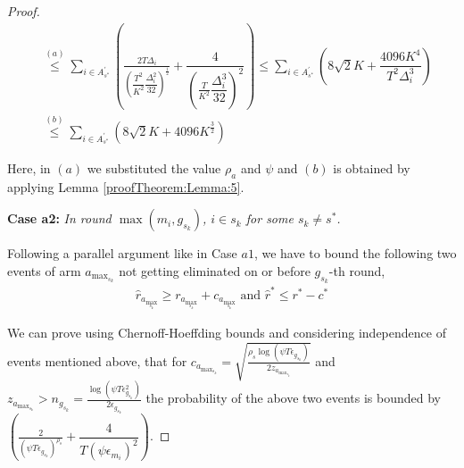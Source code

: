 \begin{proof}
\begin{align*}
&\overset{(a)}{\leq} \sum_{i\in A_{s^{*}}^{'}}\left(\frac{2T\Delta_{i}}{(\dfrac{T^2}{K^2}\dfrac{\Delta_{i}^{2}}{32})^{\frac{1}{2}}} + \dfrac{4}{(\frac{T}{K^2} \dfrac{\Delta_{i}^{3}}{32})^2}\right)  \leq \sum_{i\in A_{s^{*}}^{'}}\left(8\sqrt{2} K + \dfrac{4096 K^4}{T^2 \Delta_i^3}\right)\\
&\overset{(b)}{\leq}  \sum_{i\in A_{s^{*}}^{'}}\left(8\sqrt{2} K + 4096 K^{\frac{3}{2}}\right)
   \end{align*}
   
  Here, in $(a)$ we substituted the value $\rho_a$ and $\psi$ and $(b)$ is obtained by applying Lemma  \ref{proofTheorem:Lemma:5}.




\textbf{Case a2:} \textit{In round $\max(m_{i},g_{s_{k}})$, ${i} \in s_k$ for some $s_k \ne s^{*}$.}

Following a parallel argument like in Case $a1$, we have to bound the following two events of arm $a_{\max_{s_{k}}}$ not getting eliminated on or before $g_{s_{k}}$-th round,
\begin{align*}
  \hat{r}_{a_{\max_{s_{k}}}} \geq r_{a_{\max_{s_{k}}}} +c_{a_{\max_{s_{k}}}} \text{ and } \hat{r}^{*} \leq r^{*} - c^{*} 
\end{align*} 

We can prove using Chernoff-Hoeffding bounds and considering independence of events mentioned above, that for $c_{a_{\max_{s_{k}}}}=\sqrt{\frac{\rho_{s} \log (\psi T\epsilon_{g_{s_{k}}})}{2 z_{a_{\max_{s_{k}}}}}}$ and  $z_{a_{\max_{s_{k}}}} > n_{g_{s_{k}}}=\frac{\log{(\psi T\epsilon_{g_{s_{k}}}^{2})}}{2\epsilon_{g_{s_{k}}}}$ the probability of the above two events is bounded by $\left(\frac{2}{(\psi T\epsilon_{g_{s_{k}}})^{\rho_{s}}} + \dfrac{4}{T(\psi \epsilon_{m_i})^2}\right)$.


\end{proof}
